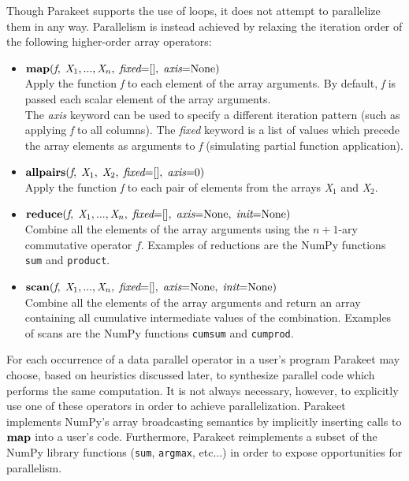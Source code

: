 \documentclass[10pt,twocolumn]{article}
\begin{document}
Though Parakeet supports the use of loops, it does not attempt to parallelize them in any way. Parallelism is instead achieved by relaxing the iteration order of the following higher-order array operators:

\begin{itemize}
\item $\mbox{\textbf{map}}(\textit{f}, \; \textit{X}_1,  ... ,  \textit{X}_n, \; \textit{fixed}\textrm{=[]}, \; \textit{axis}\textrm{=None})$ \\
  Apply the function \textit{f} to each element of the array arguments. By default, \textit{f} is passed each scalar element of the array arguments. \\
  The \textit{axis} keyword can be used to specify a different iteration pattern (such as applying \textit{f} to all columns). 
  The \textit{fixed} keyword is a list of values which precede the array elements as arguments to \textit{f} (simulating partial function application). 
       
\item $\mbox{\textbf{allpairs}}(\textit{f}, \; \textit{X}_1,  \; \textit{X}_2, \; \textit{fixed}\textrm{=[]}, \; \textit{axis}\textrm{=} 0)$ \\
  Apply the function \textit{f} to each pair of elements from the arrays \textit{X}$_1$ and \textit{X}$_2$.   
\item $\mbox{\textbf{reduce}}(\textit{f}, \; \textit{X}_1,  ... ,  \textit{X}_n, \; \textit{fixed}\textrm{=[]}, \; \textit{axis}\textrm{=None}, \; \textit{init}\textrm{=None})$ \\
  Combine all the elements of the array arguments using the $n+1$-ary commutative operator $f$. Examples of reductions are the NumPy functions \lstinline{sum} and \lstinline{product}. 
\item $\mbox{\textbf{scan}}(\textit{f}, \; \textit{X}_1,  ... ,  \textit{X}_n, \; \textit{fixed}\textrm{=[]}, \; \textit{axis}\textrm{=None}, \;  \textit{init}\textrm{=None})$ \\
  Combine all the elements of the array arguments and return an array containing all cumulative intermediate values of the combination. 
  Examples of scans are the NumPy functions \lstinline{cumsum} and \lstinline{cumprod}. 
\end{itemize}

For each occurrence of a data parallel operator in a user's program Parakeet may choose, based on heuristics discussed later, to synthesize parallel code which performs the same computation. It is not always necessary, however, to explicitly use one of these operators in order to achieve parallelization. 
Parakeet implements NumPy's array broadcasting semantics by implicitly inserting calls to $\mbox{\textbf{map}}$ into a user's code. Furthermore, Parakeet reimplements a subset of the NumPy library functions (\lstinline{sum}, \lstinline{argmax}, etc...) in order to expose opportunities for parallelism.
\end{document}
